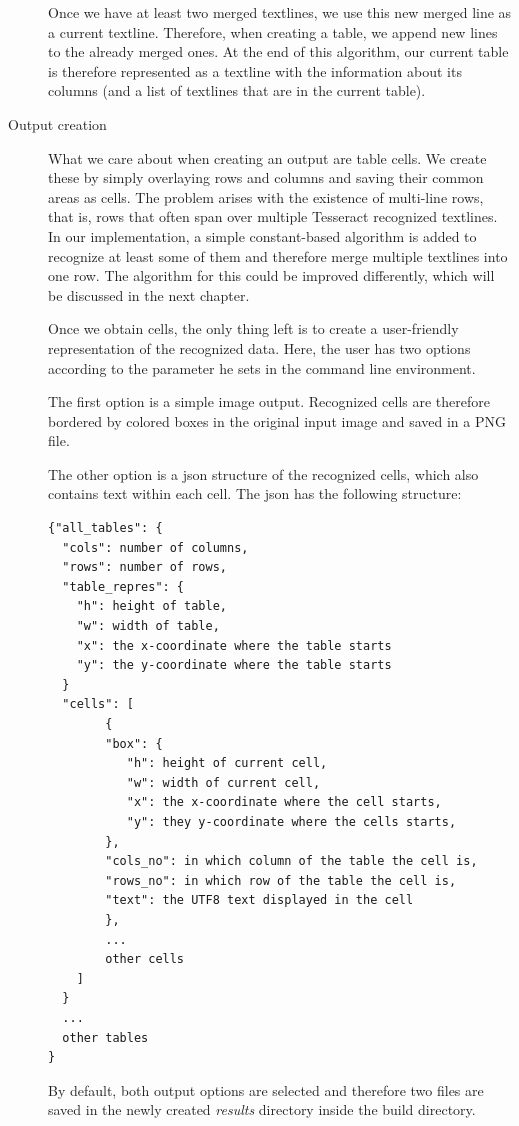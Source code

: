 \begin{description}
Once we have at least two merged textlines, we use this new merged line as a current textline. Therefore, when creating a table, we append new lines to the already merged ones. At the end of this algorithm, our current table is therefore represented as a textline with the information about its columns (and a list of textlines that are in the current table).

\item[Output creation]

What we care about when creating an output are table cells. We create these by simply overlaying  rows and columns and saving their common areas as cells. The problem arises with the existence of multi-line rows, that is, rows that often span over multiple Tesseract recognized textlines. In our implementation, a simple constant-based algorithm is added to recognize at least some of them and therefore merge multiple textlines into one row. The algorithm for this could be improved differently, which will be discussed in the next chapter. 

Once we obtain cells, the only thing left is to create a user-friendly representation of the recognized data. Here, the user has two options according to the parameter he sets in the command line environment. 

The first option is a simple image output. Recognized cells are therefore bordered  by colored boxes in the original input image and saved in a PNG file.

The other option is a json structure of the recognized cells, which also contains text within each cell. The json has the following structure:

\begin{lstlisting}
{"all_tables": {
  "cols": number of columns,
  "rows": number of rows,
  "table_repres": {
    "h": height of table,
    "w": width of table,
    "x": the x-coordinate where the table starts
    "y": the y-coordinate where the table starts
  }
  "cells": [
        {
        "box": {
           "h": height of current cell,
           "w": width of current cell,
           "x": the x-coordinate where the cell starts,
           "y": they y-coordinate where the cells starts,
        },
        "cols_no": in which column of the table the cell is,
        "rows_no": in which row of the table the cell is,
        "text": the UTF8 text displayed in the cell
        },
        ...
        other cells
    ]
  }
  ...
  other tables
}
\end{lstlisting}


By default, both output options are selected and therefore two files are saved in the newly created \emph{results} directory inside the build directory.

\end{description}

